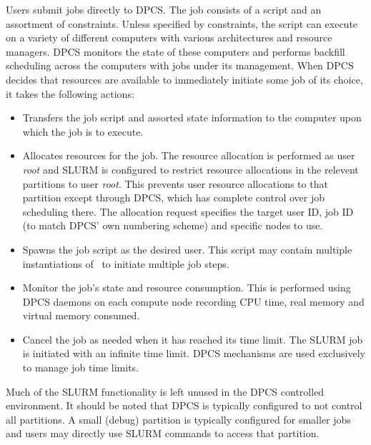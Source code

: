 Users submit jobs directly to DPCS.
The job consists of a script and an assortment of constraints.
Unless specified by constraints, the script can execute on
a variety of different computers with various architectures
and resource managers.
DPCS monitors the state of these computers and performs backfill
scheduling across the computers with jobs under its management.
When DPCS decides that resources are available to immediately
initiate some job of its choice, it takes the following
actions:
\begin{itemize}
\item Transfers the job script and assorted state information to
the computer upon which the job is to execute.

\item Allocates resources for the job.
The resource allocation is performed as user {\em root} and SLURM
is configured to restrict resource allocations in the relevent
partitions to user {\em root}.
This prevents user resource allocations to that partition
except through DPCS, which has complete control over job
scheduling there.
The allocation request specifies the target user ID, job ID
(to match DPCS' own numbering scheme) and specific nodes to use.

\item Spawns the job script as the desired user.
This script may contain multiple instantiations of \srun\
to initiate multiple job steps.

\item Monitor the job's state and resource consumption.
This is performed using DPCS daemons on each compute node
recording CPU time, real memory and virtual memory consumed.

\item Cancel the job as needed when it has reached its time limit.
The SLURM job is initiated with an infinite time limit.
DPCS mechanisms are used exclusively to manage job time limits.

\end{itemize}

Much of the SLURM functionality is left unused in the DPCS
controlled environment.
It should be noted that DPCS is typically configured to not
control all partitions.
A small (debug) partition is typically configured for smaller
jobs and users may directly use SLURM commands to access that
partition.
